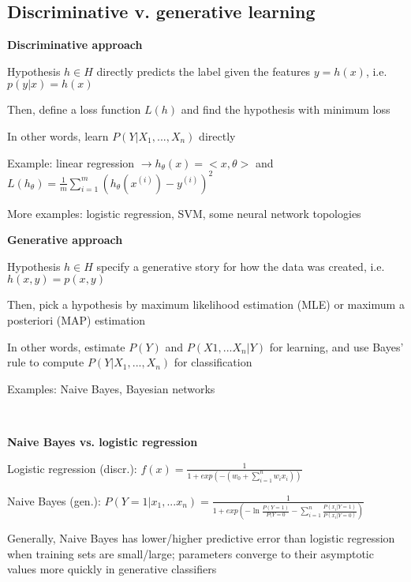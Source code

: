 \documentclass[letterpaper,fontsize=5pt]{scrartcl}
\renewenvironment{enumerate}[1]{\begin{compactenum}#1}{\end{compactenum}}
\theoremstyle{definition}
\begin{document}
\begin{multicols}{2}
\section{Discriminative v. generative learning}
	\begin{enumerate}
		\item \textbf{Discriminative approach}
			\begin{enumerate}
				\item Hypothesis $h \in H$ directly predicts the label given the features $y = h(x)$, i.e. $p(y|x) = h(x)$
				\item Then, define a loss function $L(h)$ and find the hypothesis with minimum loss
				\item In other words, learn $P(Y|X_1,...,X_n)$ directly
				\item Example: linear regression $\rightarrow h_\theta(x) = <x,\theta>$ and $L(h_\theta) = \frac{1}{m} \sum\limits_{i=1}^m (h_\theta(x^{(i)}) - y^{(i)})^2 $
				\item More examples: logistic regression, SVM, some neural network topologies
			\end{enumerate}
		\item \textbf{Generative approach}
			\begin{enumerate}
				\item Hypothesis $h \in H$ specify a generative story for how the data was created, i.e. $h(x,y) = p(x,y)$
				\item Then, pick a hypothesis by maximum likelihood estimation (MLE) or maximum a posteriori (MAP) estimation
				\item In other words, estimate $P(Y)$ and $P(X1,...X_n|Y)$ for learning, and use Bayes' rule to compute $P(Y|X_1,...,X_n)$ for classification
				\item Examples: Naive Bayes, Bayesian networks
			\end{enumerate}\
		\item \textbf{Naive Bayes vs. logistic regression}
			\begin{enumerate}
				\item Logistic regression (discr.): $f(x) = \frac{1}{1 + exp(-(w_0 + \sum\limits_{i=1}^n w_i x_i))}$
				\item Naive Bayes (gen.): $P(Y=1|x_1,...x_n) = \frac{1}{1 + exp( -\ln \frac{P(Y=1)}{P(Y=0} - \sum\limits_{i=1}^n \frac{P(x_i|Y=1)}{P(x_i|Y=0)})}$
				\item Generally, Naive Bayes has lower/higher predictive error than logistic regression when training sets are small/large; parameters converge to their asymptotic values more quickly in generative classifiers

\end{enumerate}
\end{enumerate}
\end{multicols}
\end{document}
